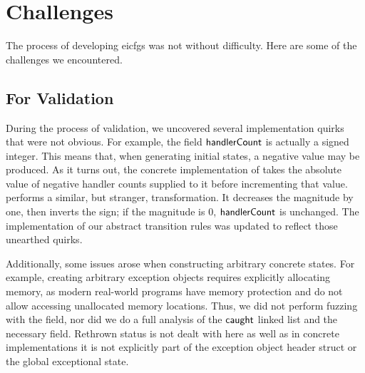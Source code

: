 
\section{Challenges}
The process of developing \acp{eicfg} was not without difficulty.
Here are some of the challenges we encountered.

\subsection{For Validation}
During the process of validation, we uncovered several implementation quirks that were not obvious.
For example, the field $\mathsf{handlerCount}$ is actually a signed integer.
This means that, when generating initial states, a negative value may be produced.
As it turns out, the concrete implementation of  takes the absolute value of negative handler counts supplied to it before incrementing that value.
 performs a similar, but stranger, transformation.
It decreases the magnitude by one, then inverts the sign; if the magnitude is 0, $\mathsf{handlerCount}$ is unchanged.
The implementation of our abstract transition rules was updated to reflect those unearthed quirks.

Additionally, some issues arose when constructing arbitrary concrete states.
For example, creating arbitrary exception objects requires explicitly allocating memory, as modern real-world programs have memory protection and do not allow accessing unallocated memory locations.
Thus, we did not perform fuzzing with the  field, nor did we do a full analysis of the $\mathsf{caught}$ linked list and the necessary  field.
Rethrown status is not dealt with here as well as in concrete implementations it is not explicitly part of the exception object header struct or the global exceptional state.

